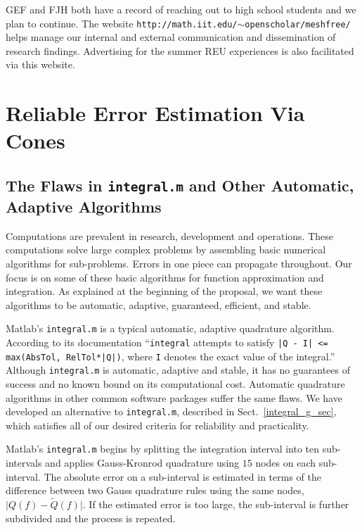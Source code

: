 \documentclass[11pt]{NSFamsart}
\newcommand{\tQ}{\widetilde{Q}}
\newcommand{\Matlab}{{\sc Matlab}\xspace}
\begin{document}
\begin{description}[leftmargin=2.5ex]
\item[Reaching Out]
GEF and FJH both have a record of reaching out to high school students and we plan to continue. The website {\tt http://math.iit.edu/$\sim$openscholar/meshfree/} helps manage our internal and external communication and dissemination of research findings. Advertising for the summer REU experiences is also facilitated via this website.



\vspace{2cm}

\section{Reliable Error Estimation Via Cones}\label{SectCones}

\subsection{The Flaws in {\tt integral.m} and Other Automatic, Adaptive Algorithms} \label{drugssubsect} Computations are prevalent in research, development and operations.  These computations solve large complex problems by assembling basic numerical algorithms for sub-problems. Errors in one piece can propagate throughout.  Our focus is on some of these basic algorithms for function approximation and integration.  As explained at the beginning of the proposal, we want these algorithms to be automatic, adaptive, guaranteed, efficient, and stable.

\Matlab's {\tt integral.m} \citep{MAT8.2} is a typical automatic, adaptive quadrature algorithm.  According to its documentation ``{\tt integral} attempts to satisfy {\tt |Q - I| <= max(AbsTol, RelTol*|Q|)}, where {\tt I} denotes the exact value of the integral.'' Although {\tt integral.m} is automatic, adaptive and stable, it has no guarantees of success and no known bound on its computational cost. Automatic quadrature algorithms in other common software packages suffer the same flaws.  We have developed an alternative to {\tt integral.m}, described in Sect.\ \ref{integral_g_sec}, which satisfies all of our desired criteria for reliability and practicality.

\Matlab's {\tt integral.m} begins by splitting the integration interval into ten sub-intervals and applies Gauss-Kronrod quadrature using $15$ nodes on each sub-interval.  The absolute error on a sub-interval is estimated in terms of the difference between two Gauss quadrature rules using the same nodes, $\bigl \lvert Q(f)-\tQ(f) \bigr \rvert$. If the estimated error is too large, the sub-interval is further subdivided and the process is repeated.


\end{description}
\end{document}
